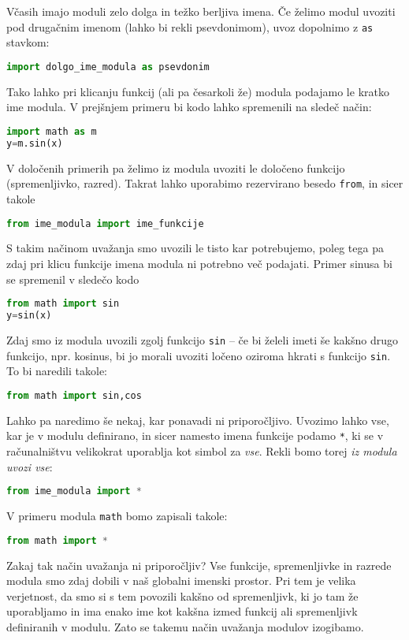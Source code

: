 Včasih imajo moduli zelo dolga in težko berljiva imena. Če želimo modul uvoziti pod drugačnim imenom (lahko bi rekli psevdonimom), uvoz dopolnimo z \texttt{as} stavkom:
\begin{lstlisting}[language=Python]
import dolgo_ime_modula as psevdonim
\end{lstlisting}
Tako lahko pri klicanju funkcij (ali pa česarkoli že) modula podajamo le kratko ime modula. V prejšnjem primeru bi kodo lahko spremenili na sledeč način:
\begin{lstlisting}[language=Python]
import math as m
y=m.sin(x)
\end{lstlisting}

V določenih primerih pa želimo iz modula uvoziti le določeno funkcijo (spremenljivko, razred). Takrat lahko uporabimo rezervirano besedo \texttt{from}, in sicer takole
\begin{lstlisting}[language=Python]
from ime_modula import ime_funkcije
\end{lstlisting}
S takim načinom uvažanja smo uvozili le tisto kar potrebujemo, poleg tega pa zdaj pri klicu funkcije imena modula ni potrebno več podajati. Primer sinusa bi se spremenil v sledečo kodo
\begin{lstlisting}[language=Python]
from math import sin
y=sin(x)
\end{lstlisting}
Zdaj smo iz modula uvozili zgolj funkcijo \texttt{sin} -- če bi želeli imeti še kakšno drugo funkcijo, npr. kosinus, bi jo morali uvoziti ločeno oziroma hkrati s funkcijo \texttt{sin}. To bi naredili takole:
\begin{lstlisting}[language=Python]
from math import sin,cos
\end{lstlisting}
Lahko pa naredimo še nekaj, kar ponavadi ni priporočljivo. Uvozimo lahko vse, kar je v modulu definirano, in sicer namesto imena funkcije podamo \texttt{*}, ki se v računalništvu velikokrat uporablja kot simbol za \emph{vse}. Rekli bomo torej \emph{iz modula uvozi vse}:
\begin{lstlisting}[language=Python]
from ime_modula import *
\end{lstlisting}
V primeru modula \texttt{math} bomo zapisali takole:
\begin{lstlisting}[language=Python]
from math import *
\end{lstlisting}
Zakaj tak način uvažanja ni priporočljiv? Vse funkcije, spremenljivke in razrede modula smo zdaj dobili v naš globalni imenski prostor. Pri tem je velika verjetnost, da smo si s tem povozili kakšno od spremenljivk, ki jo tam že uporabljamo in ima enako ime kot kakšna izmed funkcij ali spremenljivk definiranih v modulu. Zato se takemu način uvažanja modulov izogibamo.

